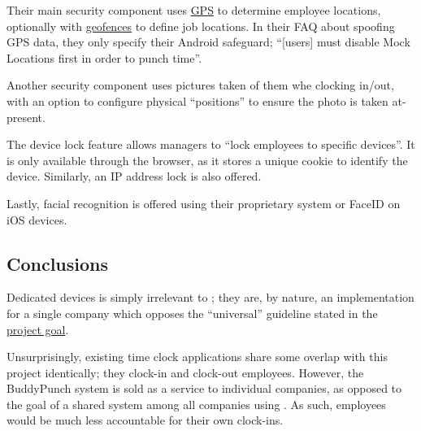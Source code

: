 Their main security component uses \hyperref[ss:gps]{GPS}
to determine employee locations, optionally with
\hyperref[ss:geofencing]{geofences} to define job
locations.
In their FAQ about spoofing GPS data, they only specify
their Android safeguard; \enquote{[users] must disable Mock
  Locations first in order to punch time}.

Another security component uses pictures taken of them whe
clocking in/out, with an option to configure physical
\enquote{positions} to ensure the photo is taken
at-present.

The device lock feature allows managers to \enquote{lock
  employees to specific devices}.
It is only available through the browser, as it stores a
unique cookie to identify the device.
Similarly, an IP address lock is also offered.

Lastly, facial recognition is offered using their
proprietary system or FaceID on iOS devices.

\subsection{Conclusions}

Dedicated devices is simply irrelevant to \projectname{};
they are, by nature, an implementation for a single company
which opposes the \enquote{universal} guideline stated in
the \hyperref[s:goal]{project goal}.

Unsurprisingly, existing time clock applications share some
overlap with this project identically; they clock-in and
clock-out employees.
However, the BuddyPunch system is sold as a service to
individual companies, as opposed to the goal of a shared
system among all companies using \projectname{}. As such,
employees would be much less accountable for their own
clock-ins. 

